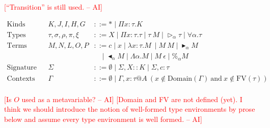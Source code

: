 \documentclass[runningheads]{llncs}
\newcommand{\G}{\Gamma}
\newcommand{\TW}{{\mathop{\triangleright}}}
\newcommand{\F}{\forall}
\newcommand{\TB}{{\mathop{\blacktriangleright}}}
\newcommand{\TBL}{{\mathop{\blacktriangleleft}}}
\newcommand{\AI}[1]{\textcolor{red}{[#1 -- AI]}}
\begin{document}
\AI{``Transition'' is still used.}

\begin{align*}
    \textrm{Kinds}           &   & K,J,I,H,G                & ::= * \mid \Pi x:\tau.K                                                                                    \\
    \textrm{Types}           &   & \tau,\sigma,\rho,\pi,\xi & ::= X \mid \Pi x:\tau.\tau \mid \tau\ M \mid \TW_{\alpha} \tau \mid \F\alpha.\tau                          \\
    \textrm{Terms}           &   & M,N,L,O,P                & ::= c \mid x \mid \lambda x:\tau.M\ \mid M\ M \mid \TB_\alpha M                                            \\
                             &   &                          & \ \ \ \ \mid \TBL_\alpha M \mid \Lambda\alpha.M \mid M\ \epsilon \mid \%_\alpha M                          \\  
    \textrm{Signature}       &   & \Sigma                   & ::= \emptyset \mid \Sigma, X::K \mid \Sigma, c:\tau                                                                        \\
    \textrm{Contexts}        &   & \Gamma                   & ::= \emptyset \mid  \Gamma,x:\tau @A\ (x\not\in\textrm{Domain}(\G)\ \text{and}\ x\not\in\textrm{FV}(\tau)) \\
\end{align*}

\AI{Is $O$ used as a metavariable?}
\AI{Domain and FV are not defined (yet).  I think we should introduce the notion of well-formed type environments by prose below and assume every type environment is well formed.}
\end{document}
